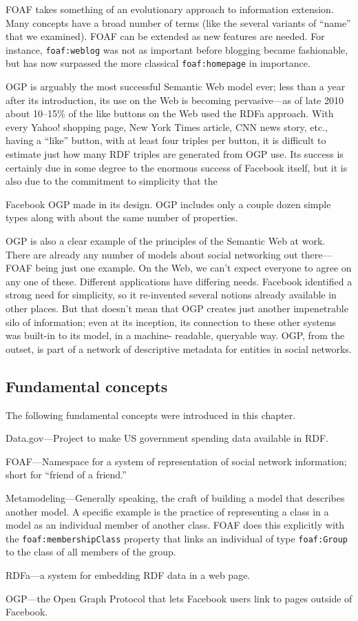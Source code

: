 FOAF takes something of an evolutionary approach to information
extension. Many concepts have a broad number of terms (like the several
variants of ``name'' that we examined). FOAF can be extended as new
features are needed. For instance, \texttt{foaf:weblog} was not as important
before blogging became fashionable, but has now surpassed the more
classical \texttt{foaf:homepage} in importance.

OGP is arguably the most successful Semantic Web model ever; less than a
year after its introduction, its use on the Web is becoming
pervasive---as of late 2010 about 10--15\% of the like buttons on the
Web used the RDFa approach. With every Yahoo! shopping page, New York
Times article, CNN news story, etc., having a ``like'' button, with at
least four triples per button, it is difficult to estimate just how many
RDF triples are generated from OGP use. Its success is certainly due in
some degree to the enormous success of Facebook itself, but it is also
due to the commitment to simplicity that the

Facebook OGP made in its design. OGP includes only a couple dozen simple
types along with about the same number of properties.

OGP is also a clear example of the principles of the Semantic Web at
work. There are already any number of models about social networking
out there---FOAF being just one example. On the Web, we can't expect
everyone to agree on any one of these. Different applications have
differing needs. Facebook identified a strong need for simplicity, so it
re-invented several notions already available in other places. But that
doesn't mean that OGP creates just another impenetrable silo of
information; even at its inception, its connection to these other
systems was built-in to its model, in a machine- readable, queryable
way. OGP, from the outset, is part of a network of descriptive metadata
for entities in social networks.





\subsection{Fundamental concepts}

The following fundamental concepts were introduced in this chapter.

Data.gov---Project to make US government spending data available in RDF.

FOAF---Namespace for a system of representation of social network
information; short for ``friend of a friend.''

Metamodeling---Generally speaking, the craft of building a model that
describes another model. A specific example is the practice of
representing a class in a model as an individual member of another
class. FOAF does this explicitly with the \texttt{foaf:membershipClass} property
that links an individual of type \texttt{foaf:Group} to the class of all members
of the group.

RDFa---a system for embedding RDF data in a web page.

OGP---the Open Graph Protocol that lets Facebook users link to pages
outside of Facebook.
